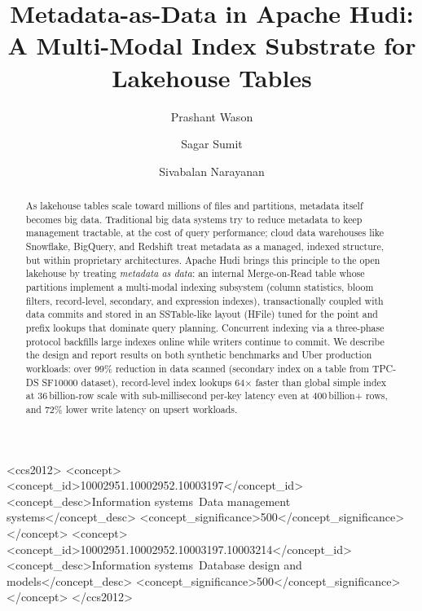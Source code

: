 \documentclass[sigconf]{acmart}
\begin{document}
\title{Metadata-as-Data in Apache Hudi: A Multi-Modal Index Substrate for Lakehouse Tables}

\author{Prashant Wason}

\author{Sagar Sumit}

\author{Sivabalan Narayanan}

\begin{abstract}
As lakehouse tables scale toward millions of files and partitions, metadata itself becomes big data.
Traditional big data systems try to reduce metadata to keep management tractable, at the cost of query performance; cloud data warehouses like Snowflake, BigQuery, and Redshift treat metadata as a managed, indexed structure, but within proprietary architectures.
Apache Hudi brings this principle to the open lakehouse by treating \emph{metadata as data}: an internal Merge-on-Read table whose partitions implement a multi-modal indexing subsystem (column statistics, bloom filters, record-level, secondary, and expression indexes), transactionally coupled with data commits and stored in an SSTable-like layout (HFile) tuned for the point and prefix lookups that dominate query planning.
Concurrent indexing via a three-phase protocol backfills large indexes online while writers continue to commit.
We describe the design and report results on both synthetic benchmarks and Uber production workloads: over 99\% reduction in data scanned (secondary index on a table from TPC-DS SF10000 dataset), record-level index lookups 64$\times$ faster than global simple index at 36\,billion-row scale with sub-millisecond per-key latency even at 400\,billion+ rows, and 72\% lower write latency on upsert workloads.
\end{abstract}

\begin{CCSXML}
<ccs2012>
 <concept>
  <concept_id>10002951.10002952.10003197</concept_id>
  <concept_desc>Information systems~Data management systems</concept_desc>
  <concept_significance>500</concept_significance>
 </concept>
 <concept>
  <concept_id>10002951.10002952.10003197.10003214</concept_id>
  <concept_desc>Information systems~Database design and models</concept_desc>
  <concept_significance>500</concept_significance>
 </concept>
</ccs2012>
\end{CCSXML}
\end{document}
